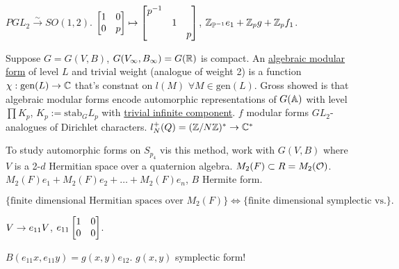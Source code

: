 \documentclass[]{article}
\begin{document}
$PGL_2 \overset{\sim}{\longrightarrow} SO(1,2)$. $\begin{bmatrix}1&0\\0&p\end{bmatrix} \mapsto \begin{bmatrix}p^{-1} &&\\&1&\\&&p\end{bmatrix}$, $\mathbb{Z}_{\mathbb{P}^{-1}}e_1 + \mathbb{Z}_pg + \mathbb{Z}_pf_1$.

\begin{definition}
	[Gross] Suppose $G = G(V,B)$, $G(V_\infty,B_\infty) = G(\mathbb{R})$ is compact. An \ul{algebraic modular form} of level $L$ and trivial weight (analogue of weight 2) is a function $\chi:\text{gen}(L) \rightarrow \mathbb{C}$ that's constnat on $l(M)$ $\forall M\in \text{gen}(L)$. Gross showed is that algebraic modular forms encode automorphic representations of $G(\mathbb{A})$ with level $\prod K_p$, $K_p := \text{stab}_G L_p$ with \ul{trivial infinite component}. $f$ modular forms $GL_2$-analogues of Dirichlet characters. $ l_N^+(Q) = (\mathbb{Z}/N\mathbb{Z})^* \rightarrow \mathbb{C}^*$
\end{definition}

To study automorphic forms on $S_{p_4}$ vis this method, work with $G(V,B)$ where $V$ is a 2-$d$ Hermitian space over a quaternion algebra. $M_2(F)\subset R = M_2(\mathcal{O})$. $M_2(F)e_1 + M_2(F)e_2 + \dots + M_2(F)e_n$, $B$ Hermite form.

\begin{theorem}
	 $$\{\text{finite dimensional Hermitian spaces over }M_2(F)\} \iff \{\text{finite dimensional symplectic vs.}\}.$$
\end{theorem}
$V \rightarrow e_{11} V$, $e_{11} \begin{bmatrix}1&0\\0&0\end{bmatrix}$.

\begin{theorem}
	$B(e_{11}x,e_{11}y) = g(x,y)e_{12}$. $g(x,y)$ symplectic form!
\end{theorem}
\end{document}
